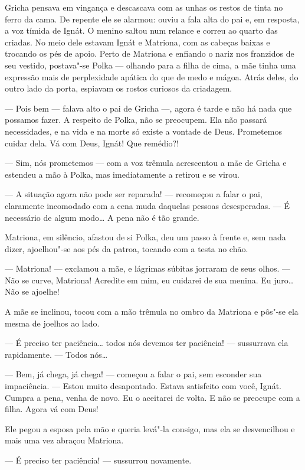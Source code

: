 Gricha pensava em vingança e descascava com as unhas os restos de tinta
no ferro da cama. De repente ele se alarmou: ouviu a fala alta do
pai e, em resposta, a voz tímida de Ignát. O menino saltou num relance e
correu ao quarto das criadas. No meio dele estavam Ignát e Matriona, com
as cabeças baixas e trocando os pés de apoio. Perto de Matriona e
enfiando o nariz nos franzidos de seu vestido, postava"-se Polka ---
olhando para a filha de cima, a mãe tinha uma expressão mais de
perplexidade apática do que de medo e mágoa. Atrás deles, do outro lado
da porta, espiavam os rostos curiosos da criadagem.

--- Pois bem --- falava alto o pai de Gricha ---, agora é tarde e não há
nada que possamos fazer. A respeito de Polka, não se preocupem. Ela não
passará necessidades, e na vida e na morte só existe a vontade de Deus.
Prometemos cuidar dela. Vá com Deus, Ignát! Que remédio?!

--- Sim, nós prometemos --- com a voz trêmula acrescentou a mãe de
Gricha e estendeu a mão à Polka, mas imediatamente a retirou e se virou.

--- A situação agora não pode ser reparada! --- recomeçou a falar o pai,
claramente incomodado com a cena muda daquelas pessoas desesperadas. --- É
necessário de algum modo\ldots{} A pena não é tão grande.

Matriona, em silêncio, afastou de si Polka, deu um passo à frente e, sem
nada dizer, ajoelhou"-se aos pés da patroa, tocando com a testa no chão.

--- Matriona! --- exclamou a mãe, e lágrimas súbitas jorraram de seus
olhos. --- Não se curve, Matriona! Acredite em mim, eu cuidarei de sua
menina. Eu juro\ldots{} Não se ajoelhe!

A mãe se inclinou, tocou com a mão trêmula no ombro da Matriona e pôs"-se
ela mesma de joelhos ao lado.

--- É preciso ter paciência\ldots{} todos nós devemos ter paciência! ---
sussurrava ela rapidamente. --- Todos nós\ldots{}

--- Bem, já chega, já chega! --- começou a falar o pai, sem esconder sua
impaciência. --- Estou muito desapontado. Estava satisfeito com você,
Ignát. Cumpra a pena, venha de novo. Eu o aceitarei de volta. E não se
preocupe com a filha. Agora vá com Deus!

Ele pegou a esposa pela mão e queria levá"-la consigo, mas ela se
desvencilhou e mais uma vez abraçou Matriona.

--- É preciso ter paciência! --- sussurrou novamente.

